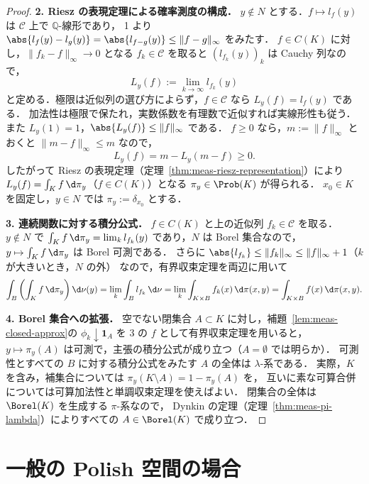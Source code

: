 \begin{proof}
  \textbf{2. Riesz の表現定理による確率測度の構成．}
  $y\notin N$ とする．$f\mapsto l_f(y)$ は $\mathcal{C}$ 上で $\mathbb{Q}$-線形であり，
  1 より $\abs{l_f(y)-l_g(y)}=\abs{l_{f-g}(y)}\leq\lVert f-g\rVert_\infty$ をみたす．
  $f\in C(K)$ に対し，$\lVert f_k-f\rVert_\infty\to0$ となる $f_k\in\mathcal{C}$ を取ると
  $(l_{f_k}(y))_k$ は Cauchy 列なので，
  \[
    L_y(f):=\lim_{k\to\infty}l_{f_k}(y)
  \]
  と定める．極限は近似列の選び方によらず，$f\in\mathcal{C}$ なら $L_y(f)=l_f(y)$ である．
  加法性は極限で保たれ，実数係数を有理数で近似すれば実線形性も従う．
  また $L_y(1)=1$，$\abs{L_y(f)}\leq\lVert f\rVert_\infty$ である．
  $f\geq0$ なら，$m:=\lVert f\rVert_\infty$ とおくと $\lVert m-f\rVert_\infty\leq m$ なので，
  \[
    L_y(f)=m-L_y(m-f)\geq0.
  \]
  したがって Riesz の表現定理（定理~\ref{thm:meas-riesz-representation}）により
  $L_y(f)=\int_Kf\,\d\pi_y$（$f\in C(K)$）となる $\pi_y\in\Prob(K)$ が得られる．
  $x_0\in K$ を固定し，$y\in N$ では $\pi_y:=\delta_{x_0}$ とする．

  \textbf{3. 連続関数に対する積分公式．}
  $f\in C(K)$ と上の近似列 $f_k\in\mathcal{C}$ を取る．
  $y\notin N$ で $\int_Kf\,\d\pi_y=\lim_kl_{f_k}(y)$ であり，$N$ は Borel 集合なので，
  $y\mapsto\int_Kf\,\d\pi_y$ は Borel 可測である．
  さらに $\abs{l_{f_k}}\leq\lVert f_k\rVert_\infty\leq\lVert f\rVert_\infty+1$（$k$ が大きいとき，$N$ の外）
  なので，有界収束定理を両辺に用いて
  \[
    \int_B\left(\int_Kf\,\d\pi_y\right)\d\nu(y)
    =\lim_k\int_Bl_{f_k}\,\d\nu
    =\lim_k\int_{K\times B}f_k(x)\,\d\pi(x,y)
    =\int_{K\times B}f(x)\,\d\pi(x,y).
  \]

  \textbf{4. Borel 集合への拡張．}
  空でない閉集合 $A\subset K$ に対し，補題~\ref{lem:meas-closed-approx}の
  $\phi_k\downarrow\mathbf{1}_A$ を 3 の $f$ として有界収束定理を用いると，
  $y\mapsto\pi_y(A)$ は可測で，主張の積分公式が成り立つ（$A=\emptyset$ では明らか）．
  可測性とすべての $B$ に対する積分公式をみたす $A$ の全体は $\lambda$-系である．
  実際，$K$ を含み，補集合については $\pi_y(K\setminus A)=1-\pi_y(A)$ を，
  互いに素な可算合併については可算加法性と単調収束定理を使えばよい．
  閉集合の全体は $\Borel(K)$ を生成する $\pi$-系なので，
  Dynkin の定理（定理~\ref{thm:meas-pi-lambda}）によりすべての $A\in\Borel(K)$ で成り立つ．
\end{proof}

\section{一般の Polish 空間の場合}

